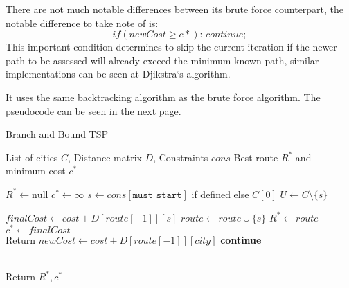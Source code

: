 There are not much notable differences between its brute force counterpart, the notable difference to take note of is:
\[
if(newCost \geq c*)\text{: }continue;
\]
This important condition determines to skip the current iteration if the newer path to be assessed will already exceed the minimum known path, similar implementations can be seen at Djikstra`s algorithm.

It uses the same backtracking algorithm as the brute force algorithm. The pseudocode can be seen in the next page.
\begin{algorithm}[H]
    \caption{Branch and Bound TSP}
    \begin{algorithmic}
    \Require{} List of cities $C$, Distance matrix $D$, Constraints $cons$
    \Ensure{} Best route $R^*$ and minimum cost $c^*$
    
    \State{} $R^* \gets \text{null}$
    \State{} $c^* \gets \infty$
    \State{} $s \gets cons[\texttt{must\_start}]$ if defined else $C[0]$
    \State{} $U \gets C \setminus \{s\}$
    
            \State{} $finalCost \gets cost + D[route[-1]][s]$
            \State{} $route \gets route \cup \{s\}$
                \State{} $R^* \gets route$
                \State{} $c^* \gets finalCost$
            \EndIf{}
            \State{} \\Return{}
        \EndIf{}
            \State{} $newCost \gets cost + D[route[-1]][city]$
                \State{} \textbf{continue}
            \EndIf{}
            \State{} 
        \EndFor{}
    \EndFunction{}
    
    \State{} 
    \State{} \\Return{} $R^*, c^*$
    \end{algorithmic}
\end{algorithm}